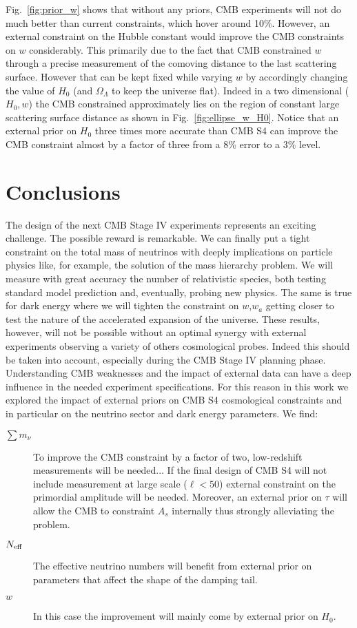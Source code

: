 \documentclass[aps,prd,reprint,superscriptaddress]{revtex4-1}
\newcommand{\reffig}[1]{Fig.~\ref{fig:#1}}
\begin{document}
\reffig{prior_w} shows that without any priors, CMB experiments will not do much better than current constraints, which hover around 10\%. However, an external constraint on the Hubble constant would improve the CMB constraints on $w$ considerably. 
This primarily due to the fact that CMB constrained $w$ through a precise measurement of the comoving distance to the last scattering surface. However that can be kept fixed while varying $w$ by accordingly changing the value of $H_{0}$ (and $\Omega_{\Lambda}$ to keep the universe flat). Indeed in a two dimensional ($H_{0},w$) the CMB constrained approximately lies on the region of constant large scattering surface distance as shown in \reffig{ellipse_w_H0}.
Notice that an external prior on $H_{0}$ three times more accurate than CMB S4 can improve the CMB constraint almost by a factor of three from a $8\%$ error to a $3\%$ level.

\section{Conclusions  \label{sec:conclusions}}
The design of the next CMB Stage IV experiments represents an exciting challenge. The possible reward is remarkable. We can finally put a tight constraint on the total mass of neutrinos with deeply implications on particle physics like, for example, the solution of the mass hierarchy problem. We will measure with great accuracy the number of relativistic species, both testing standard model prediction and, eventually, probing new physics. The same is true for dark energy where we will tighten the constraint on $w$,$w_{a}$ getting closer to test the nature of the accelerated expansion of the universe. These results, however, will not be possible without an optimal synergy with external experiments observing a variety of others cosmological probes.
Indeed this should be taken into account, especially during the CMB Stage IV planning phase. Understanding CMB weaknesses and the impact of external data can have a deep influence in the needed experiment specifications.
For this reason in this work we explored the impact of external priors on CMB S4 cosmological constraints and in particular on the neutrino sector and dark energy parameters.
We find:
\begin{description}
\item[$\sum m_\nu$] To improve the CMB constraint by a factor of two, low-redshift measurements will be needed... If the final design of CMB S4 will not include measurement at large scale ($\ell<50$) external constraint on the primordial amplitude will be needed. Moreover, an external prior on $\tau$ will allow the CMB to constraint $A_{s}$ internally thus strongly alleviating the problem.
\item[$N_{\rm eff}$] The effective neutrino numbers will benefit from external prior on parameters that affect the shape of the damping tail.
\item[$w$] In this case the improvement will mainly come by external prior on $H_{0}$.
\end{description}
\end{document}
